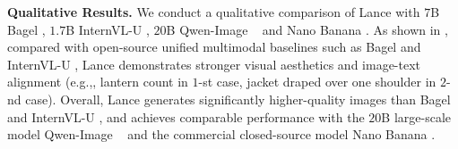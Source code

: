 \documentclass{llmxive}
\providecommand{\eg}{e.g.,\xspace}
\begin{document}
\textbf{Qualitative Results.}
We conduct a qualitative comparison of Lance with $7$B Bagel \cite{deng2025emerging}, $1.7$B InternVL-U \cite{tian2026internvlu}, $20$B Qwen-Image  ~\cite{wu2025qwen} and Nano Banana \cite{Gemini3pro}. 
As shown in , compared with open-source unified multimodal baselines such as Bagel \cite{deng2025emerging} and InternVL-U \cite{tian2026internvlu}, Lance demonstrates stronger visual aesthetics and image-text alignment (\eg, lantern count in $1$-st case,
jacket draped over one shoulder in $2$-nd case).
Overall, Lance generates significantly higher-quality images than Bagel \cite{deng2025emerging} and InternVL-U \cite{tian2026internvlu}, and achieves comparable performance with the $20$B large-scale model Qwen-Image  ~\cite{wu2025qwen} and the commercial closed-source model Nano Banana \cite{Gemini3pro}.
\end{document}
